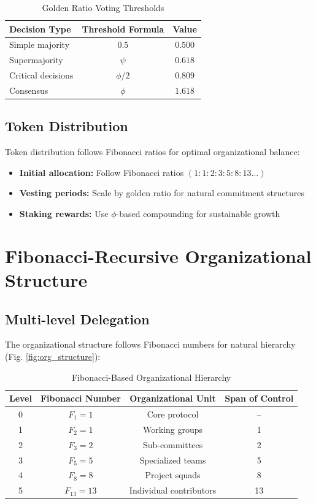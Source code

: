 \documentclass[AMA]{WileyNJD-AMA}
\begin{document}
\begin{table}[h]
\caption{Golden Ratio Voting Thresholds}
\label{tab:thresholds}
\centering
\begin{tabular}{lcc}
\hline
Decision Type & Threshold Formula & Value \\
\hline
Simple majority & $0.5$ & $0.500$ \\
Supermajority & $\psi$ & $0.618$ \\
Critical decisions & $\phi/2$ & $0.809$ \\
Consensus & $\phi$ & $1.618$ \\
\hline
\end{tabular}
\end{table}

\subsection{Token Distribution}

Token distribution follows Fibonacci ratios for optimal organizational balance:

\begin{itemize}
    \item \textbf{Initial allocation:} Follow Fibonacci ratios $(1:1:2:3:5:8:13\ldots)$
    \item \textbf{Vesting periods:} Scale by golden ratio for natural commitment structures
    \item \textbf{Staking rewards:} Use $\phi$-based compounding for sustainable growth
\end{itemize}

\section{Fibonacci-Recursive Organizational Structure}

\subsection{Multi-level Delegation}

The organizational structure follows Fibonacci numbers for natural hierarchy (Fig. \ref{fig:org_structure}):

\begin{table}[h]
\caption{Fibonacci-Based Organizational Hierarchy}
\label{tab:hierarchy}
\centering
\begin{tabular}{cccc}
\hline
Level & Fibonacci Number & Organizational Unit & Span of Control \\
\hline
0 & $F_1 = 1$ & Core protocol & -- \\
1 & $F_2 = 1$ & Working groups & 1 \\
2 & $F_3 = 2$ & Sub-committees & 2 \\
3 & $F_5 = 5$ & Specialized teams & 5 \\
4 & $F_8 = 8$ & Project squads & 8 \\
5 & $F_{13} = 13$ & Individual contributors & 13 \\
\hline
\end{tabular}
\end{table}
\end{document}
